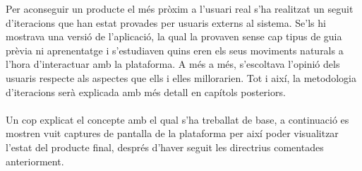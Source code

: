 Per aconseguir un producte el més pròxim a l'usuari real s'ha realitzat un seguit d'iteracions que han estat provades per usuaris externs al sistema. Se'ls hi mostrava una versió de l'aplicació, la qual la provaven sense cap tipus de guia prèvia ni aprenentatge i s'estudiaven quins eren els seus moviments naturals a l'hora d'interactuar amb la plataforma. A més a més, s'escoltava l'opinió dels usuaris respecte als aspectes que ells i elles millorarien. Tot i així, la metodologia d'iteracions serà explicada amb més detall en capítols posteriors.
\\\\
Un cop explicat el concepte amb el qual s'ha treballat de base, a continuació es mostren vuit captures de pantalla de la plataforma per així poder visualitzar l'estat del producte final, després d'haver seguit les directrius comentades anteriorment.

